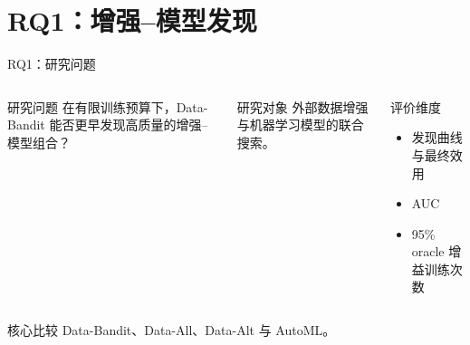 
\providecommand{\slideref}[1]{\textcolor{black!60}{\small [#1]}}


\section{RQ1：增强--模型发现}
\ifdefined\showrqone

\begin{frame}{RQ1：研究问题}
\begin{columns}[T,onlytextwidth]
\begin{block}{研究问题}
在有限训练预算下，Data-Bandit 能否更早发现高质量的增强--模型组合？
\end{block}
\begin{block}{研究对象}
外部数据增强与机器学习模型的联合搜索。
\end{block}
\begin{block}{评价维度}
\begin{itemize}
  \item 发现曲线与最终效用
  \item AUC
  \item 95\% oracle 增益训练次数
\end{itemize}
\end{block}
\end{columns}
\begin{alertblock}{核心比较}
Data-Bandit、Data-All、Data-Alt 与 AutoML。
\end{alertblock}
\end{frame}

